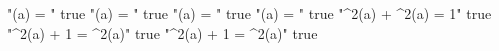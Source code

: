 "\sin(a) = " true
"\cos(a) = " true
"\tan(a) = " true
"\cotan(a) = " true
"\sin^2(a) + \cos^2(a) = 1" true
"\tan^2(a) + 1 = \sec^2(a)" true
"\cot^2(a) + 1 = \csc^2(a)" true
